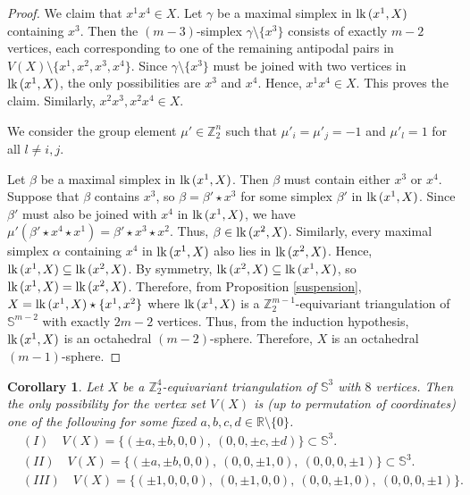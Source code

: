 \documentclass[11pt]{amsart}
\numberwithin{equation}{section}
\newtheorem{corollary}[theorem]{Corollary}
\theoremstyle{definition}
\newcommand{\lk}{\mbox{\upshape lk}\,}
\newcommand{\Sp}{\mathbb{S}}
\def \bb{\mathbb}
\def \ZZ{{\bb{Z}}}
\begin{document}
\begin{proof}
We claim that $x^1 x^4 \in X$. Let $\gamma$ be a maximal simplex in $\lk(x^1, X)$ containing $x^3$. Then the $(m - 3)$-simplex $\gamma \setminus \{x^3\}$ consists of exactly $m - 2$ vertices, each corresponding to one of the remaining antipodal pairs in $V(X) \setminus \{x^1, x^2, x^3, x^4\}$. Since $\gamma \setminus \{x^3\}$ must be joined with two vertices in $\lk(x^1, X)$, the only possibilities are $x^3$ and $x^4$. Hence, $x^1 x^4 \in X$. This proves the claim. Similarly, $x^2 x^3, x^2 x^4 \in X$.

We consider the group element $\mu' \in \ZZ_2^n$ such that $\mu'_i = \mu'_j = -1$ and $\mu'_l = 1$ for all $l \neq i, j$. 

Let $\beta$ be a maximal simplex in $\lk(x^1, X)$. Then $\beta$ must contain either $x^3$ or $x^4$. Suppose that $\beta$ contains $x^3$, so $\beta = \beta' \star x^3$ for some simplex $\beta'$ in $\lk(x^1, X)$. Since $\beta'$ must also be joined with $x^4$ in $\lk(x^1, X)$, we have $\mu'(\beta' \star x^4 \star x^1) = \beta' \star x^3 \star x^2$. Thus, $\beta \in \lk(x^2, X)$. Similarly, every maximal simplex $\alpha$ containing $x^4$ in $\lk(x^1, X)$ also lies in $\lk(x^2, X)$. Hence, $\lk(x^1, X) \subseteq \lk(x^2, X)$. By symmetry, $\lk(x^2, X) \subseteq \lk(x^1, X)$, so $\lk(x^1, X) = \lk(x^2, X)$.
Therefore, from Proposition \ref{suspension}, $X=\lk(x^1,X)\star\{x^1,x^2\}$ where $\lk(x^1,X)$ is a $\ZZ^{m-1}_2$-equivariant triangulation of $\Sp^{m-2}$ with exactly $2m-2$ vertices. Thus, from the induction hypothesis, $\lk(x^1,X)$ is an octahedral $(m-2)$-sphere. Therefore, $X$ is an octahedral $(m-1)$-sphere. 
\end{proof}


\begin{corollary}\label{8vertex}
Let $X$ be a $\mathbb{Z}_2^4$-equivariant triangulation of $\mathbb{S}^3$ with $8$ vertices. 
Then the only possibility for the vertex set $V(X)$ is (up to permutation of coordinates) one of the following for some fixed $a,b,c,d \in\mathbb{R}\setminus\{0\}$.
$$
\begin{aligned}
&(I)\quad  V(X) = \{(\pm a,\pm b,0,0),\ (0,0,\pm c,\pm d)\} \subset \mathbb{S}^3.\\
&(II)\quad V(X) = \{(\pm a,\pm b,0,0),\ (0,0,\pm 1,0),\ (0,0,0,\pm 1)\} \subset \mathbb{S}^3.\\
&(III)\quad V(X) = \{(\pm 1,0,0,0),\ (0,\pm 1,0,0),\ (0,0,\pm 1,0),\ (0,0,0,\pm 1)\}.
\end{aligned}
$$
\end{corollary}
\end{document}
